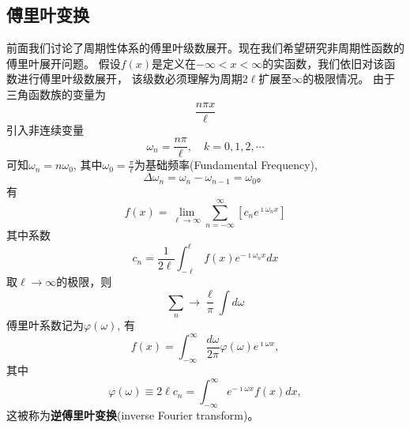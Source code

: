 \subsection{傅里叶变换}
\label{subsec:fourier_transform}
前面我们讨论了周期性体系的傅里叶级数展开。现在我们希望研究非周期性函数的傅里叶展开问题。
假设$f(x)$是定义在$-\infty < x < \infty$的实函数，我们依旧对该函数进行傅里叶级数展开，
该级数必须理解为周期$2\ell$扩展至$\infty$的极限情况。
由于三角函数族的变量为
\[
 \frac{n\pi x}{\ell}    
\]
引入非连续变量
\[\omega_n = \frac{n\pi} {\ell}, \quad k = 0,1,2,\cdots
    \]
可知$\omega_n = n \omega_0$, 其中$\omega_0 = \frac{\pi}{\ell}$为基础频率(Fundamental Frequency),
\[\Delta \omega_n = \omega_n - \omega_{n-1} = \omega_0 \textrm{。} \] 
有
\begin{equation}
    f(x) = \lim_{\ell\to \infty} \sum_{n=-\infty}^{\infty} \left[
        c_n e^{\imath \omega_n x}
    \right]
\end{equation}
其中系数
\begin{equation}
    c_n = \frac{1}{2\ell} \int_{-\ell}^{\ell} f(x) e^{-\imath \omega_n x} dx 
\end{equation}
取$\ell\to \infty$的极限，则
\[
  \sum_n \to  \frac{ \ell}{\pi}  \int d\omega 
\]
傅里叶系数记为$\varphi(\omega)$,
有
\begin{equation}
    f(x) = \int_{-\infty}^{\infty} \frac{d \omega }{2\pi}\varphi(\omega) e^{\imath \omega x}, %
\end{equation}
其中
\begin{equation}
    \varphi (\omega) \equiv 2\ell c_n = \int_{-\infty}^{\infty} e^{-\imath \omega x} f(x) dx,
\end{equation}
这被称为\textbf{逆傅里叶变换}(inverse Fourier transform)。
